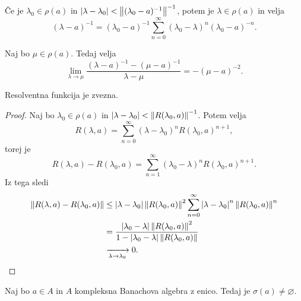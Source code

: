 \begin{opomba}
  Če je $\lambda_0 \in \rho(a)$ in $\left| \lambda - \lambda_0 \right| < \left\lVert(\lambda_0
	- a)^{-1}\right\rVert^{-1}$, potem je $\lambda \in \rho(a)$ in velja
  \[
	(\lambda - a)^{-1} = (\lambda_0 - a)^{-1} \sum_{n=0}^\infty (\lambda_0 -
	\lambda)^n (\lambda_0 - a)^{-n}.
  \]
\end{opomba}

\begin{trditev}
  Naj bo $\mu \in \rho(a)$.
  Tedaj velja
  \[
	\lim_{\lambda \to \mu} \frac{(\lambda - a)^{-1} - (\mu - a)^{-1}}{\lambda -
	  \mu}
	= -(\mu - a)^{-2}.
  \]
\end{trditev}

\begin{trditev}
  Resolventna funkcija je zvezna.
\end{trditev}

\begin{proof}
  Naj bo $\lambda_0 \in \rho(a)$ in $\left| \lambda - \lambda_0 \right| <
  \left\lVert R(\lambda_0, a)\right\rVert^{-1}$.
  Potem velja
  \[
	R(\lambda,a) = \sum_{n=0}^\infty (\lambda - \lambda_0)^n R(\lambda_0,
	a)^{n+1},
  \]
  torej je
  \[
	R(\lambda, a) - R(\lambda_0, a) = \sum_{n=1}^\infty (\lambda_0 - \lambda)^n
	R(\lambda_0, a)^{n+1}.
  \]
  Iz tega sledi
  \begin{align*}
	\left\lVert R(\lambda, a) - R(\lambda_0, a)\right\rVert
	&\le \left| \lambda - \lambda_0 \right| \left\lVert R(\lambda_0, a)\right\rVert^2 \sum_{n=0}^\infty \left| \lambda - \lambda_0 \right|^n \left\lVert R(\lambda_0, a)\right\rVert^n \\
	&= \frac{\left| \lambda_0 - \lambda \right| \left\lVert R(\lambda_0, a)\right\rVert^2}{1 - \left| \lambda_0 - \lambda \right| \left\lVert R(\lambda_0, a)\right\rVert} \\
	&\xrightarrow[\lambda \to \lambda_0]{} 0.
	  \qedhere
  \end{align*}
\end{proof}

\begin{izrek}
  Naj bo $a \in A$ in $A$ kompleksna Banachova algebra z enico.
  Tedaj je $\sigma(a) \ne \varnothing$.
\end{izrek}

